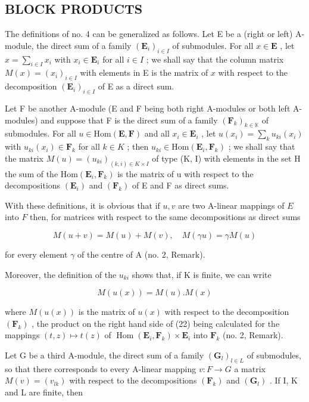 \subsection{BLOCK PRODUCTS}

The definitions of no. 4 can be generalized as follows. Let E be a (right or left) A-module, the direct sum of a family \((\mathbf{E}_i)_{i\in I}\) of submodules. For all \(x\in \mathbf{E}\) , let \(x = \sum_{i\in I}x_i\) with \(x_{i}\in \mathbf{E}_{i}\) for all \(i\in I\) ; we shall say that the column matrix \(M(x) = (x_{i})_{i\in I}\) with elements in E is the matrix of \(x\) with respect to the decomposition \((\mathbf{E}_i)_{i\in I}\) of E as a direct sum.

Let F be another A-module (E and F being both right A-modules or both left A-modules) and suppose that F is the direct sum of a family \((\mathbf{F}_{k})_{k\in\mathbb{K}}\) of submodules. For all \(u\in\mathrm{Hom}(\mathbf{E},\mathbf{F})\) and all \(x_{i}\in\mathbf{E}_{i}\) , let \(u(x_{i})=\sum_{k}u_{ki}(x_{i})\) with \(u_{ki}(x_{i})\in\mathbf{F}_{k}\) for all \(k\in K\) ; then \(u_{ki}\in\mathrm{Hom}(\mathbf{E}_{i},\mathbf{F}_{k})\) ; we shall say that the matrix \(M(u)=(u_{ki})_{(k,i)\in K\times I}\) of type (K, I) with elements in the set H the sum of the \(\mathrm{Hom}(\mathbf{E}_{i},\mathbf{F}_{k})\) is the matrix of u with respect to the decompositions \((\mathbf{E}_{i})\) and \((\mathbf{F}_{k})\) of E and F as direct sums.

With these definitions, it is obvious that if \(u, v\) are two A-linear mappings of \(E\) into \(F\) then, for matrices with respect to the same decompositions as direct sums

\[
M (u + v) = M (u) + M (v), \quad M (\gamma u) = \gamma M (u)\tag{21}
\]

for every element \(\gamma\) of the centre of A (no. 2, Remark).

Moreover, the definition of the \(u_{ki}\) shows that, if K is finite, we can write

\[
M (u (x)) = M (u). M (x)\tag{22}
\]

where \(M(u(x))\) is the matrix of \(u(x)\) with respect to the decomposition \((\mathbf{F}_k)\) , the product on the right hand side of (22) being calculated for the mappings \((t, z) \mapsto t(z)\) of \(\operatorname{Hom}(\mathbf{E}_i, \mathbf{F}_k) \times \mathbf{E}_i\) into \(\mathbf{F}_k\) (no. 2, Remark).

Let G be a third A-module, the direct sum of a family \((\mathbf{G}_{l})_{l\in L}\) of submodules, so that there corresponds to every A-linear mapping \(v:F\to G\) a matrix \(M(v)=(v_{lk})\) with respect to the decompositions \((\mathbf{F}_{k})\) and \((\mathbf{G}_{l})\) . If I, K and L are finite, then

